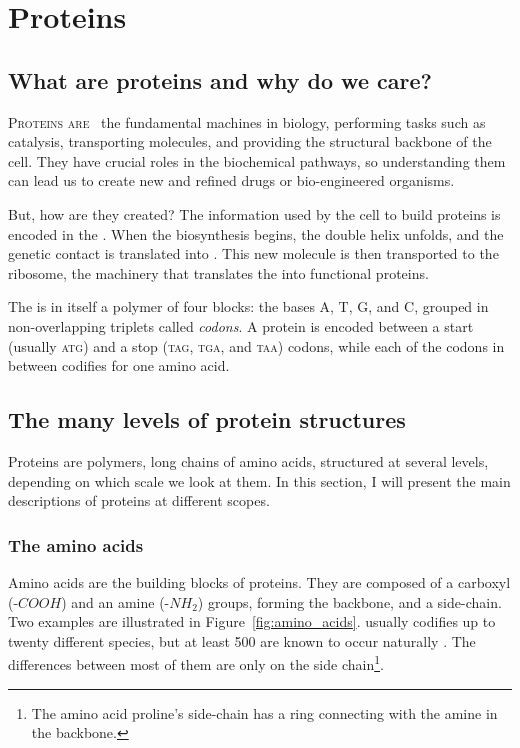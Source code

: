 \chapter{Proteins}
\section[What are proteins?]{What are proteins and why do we care?}
\lettrine[lines=3, lhang=0.25,  nindent=0em, findent=2pt]{\color{Maroon}P}{roteins are\ }
the fundamental machines in biology, performing tasks such as catalysis, transporting molecules, and providing the structural backbone of the cell.
They have crucial roles in the biochemical pathways, so understanding them can lead us to create new and refined drugs or bio-engineered organisms.


But, how are they created?
The information 
used by the cell to build proteins is encoded in the \DNA.
When the biosynthesis begins, the double helix unfolds, and the genetic contact is translated into \RNA{}.
This new molecule is then transported to the ribosome, the machinery that translates the \RNA{} into functional proteins.

The \DNA{} is in itself a polymer of four blocks: the bases A, T, G, and C,
grouped in non-overlapping triplets called \emph{codons}.
A protein is encoded between a start (usually \textsc{atg}) and a stop (\textsc{tag}, \textsc{tga}, and \textsc{taa}) codons, while each of the codons in between codifies for one amino acid.

\section{The many levels of protein structures}
Proteins are polymers, long chains of amino acids, structured at several levels, depending on which scale we look at them.
In this section, I will present the main descriptions of proteins at different scopes.

\subsection{The amino acids}
Amino acids are the building blocks of proteins.
They are composed of a carboxyl (-$COOH$) and an amine (-$NH_2$) groups, forming the backbone, and a side-chain.
Two examples are illustrated in Figure~\ref{fig:amino_acids}.
\DNA{} usually codifies up to twenty different species, but at least 500 are known to occur naturally \citep{500_amino_acids}.
The differences between most of them are only on the side chain\footnote{The amino acid proline's side-chain has a ring connecting with the amine in the backbone.}.

